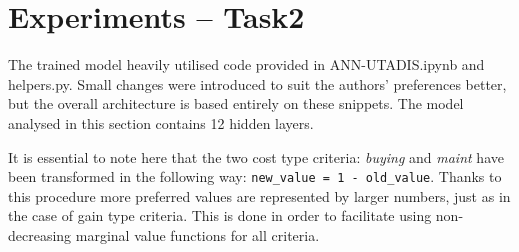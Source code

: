 \documentclass[../main.tex]{subfiles}
\begin{document}
\section{Experiments -- Task2}

The trained model heavily utilised code provided in ANN-UTADIS.ipynb and helpers.py.
Small changes were introduced to suit the authors' preferences better, but the overall
architecture is based entirely on these snippets.
The model analysed in this section contains 12 hidden layers.

It is essential to note here that the two cost type criteria: \emph{buying} and \emph{maint}
have been transformed in the following way:
\verb|new_value = 1 - old_value|.
Thanks to this procedure more preferred values are represented by larger numbers,
just as in the case of gain type criteria.
This is done in order to facilitate using non-decreasing marginal value functions for all criteria.
\end{document}
